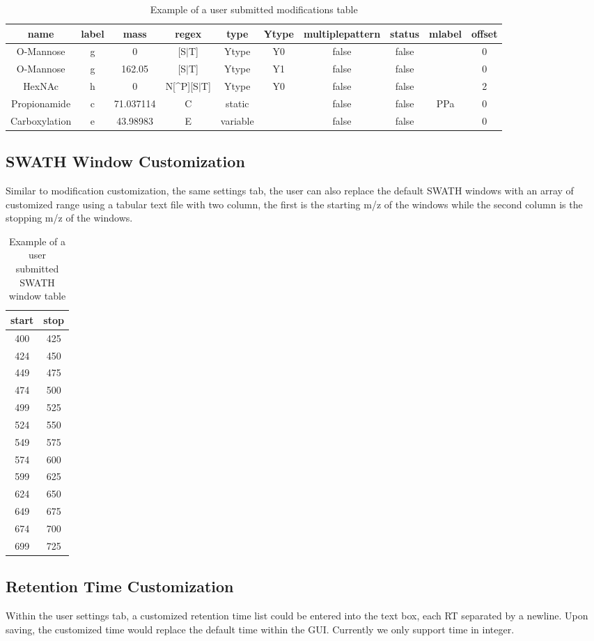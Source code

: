 \documentclass[../manual.tex]{subfiles}
\begin{document}
\begin{table}[h]
	\caption{Example of a user submitted modifications table}
	\begin{adjustbox}{width=1\textwidth}
		\small
		\begin{tabular}{c c c c c c c c c c}
			\hline name   & label & mass      & regex           & type     & Ytype & multiplepattern & status & mlabel & offset \\ [0.1ex]
			\hline\hline
			O-Mannose     & g     & 0         & [S$|$T]         & Ytype    & Y0    & false           & false  &        & 0      \\
			O-Mannose     & g     & 162.05    & [S$|$T]         & Ytype    & Y1    & false           & false  &        & 0      \\
			HexNAc        & h     & 0         & N[\^{}P][S$|$T] & Ytype    & Y0    & false           & false  &        & 2      \\
			Propionamide  & c     & 71.037114 & C               & static   &       & false           & false  & PPa    & 0      \\
			Carboxylation & e     & 43.98983  & E               & variable &       & false           & false  &        & 0      \\
		\end{tabular}
	\end{adjustbox}
\end{table}

\subsection{SWATH Window Customization}
Similar to modification customization, the same settings tab, the user can also replace the default SWATH windows with an array of customized range using a tabular text file with two column, the first is the starting m/z of the windows while the second column is the stopping m/z of the windows.
\begin{table}[h]
	\caption{Example of a user submitted SWATH window table}
	\centering
	\begin{tabular}{c c}
		\hline start & stop \\
		\hline\hline
		400          & 425  \\
		424          & 450  \\
		449          & 475  \\
		474          & 500  \\
		499          & 525  \\
		524          & 550  \\
		549          & 575  \\
		574          & 600  \\
		599          & 625  \\
		624          & 650  \\
		649          & 675  \\
		674          & 700  \\
		699          & 725  \\
	\end{tabular}
\end{table}

\subsection{Retention Time Customization}
Within the user settings tab, a customized retention time list could be entered into the text box, each RT separated by a newline. Upon saving, the customized time would replace the default time within the GUI. Currently we only support time in integer.
\end{document}
